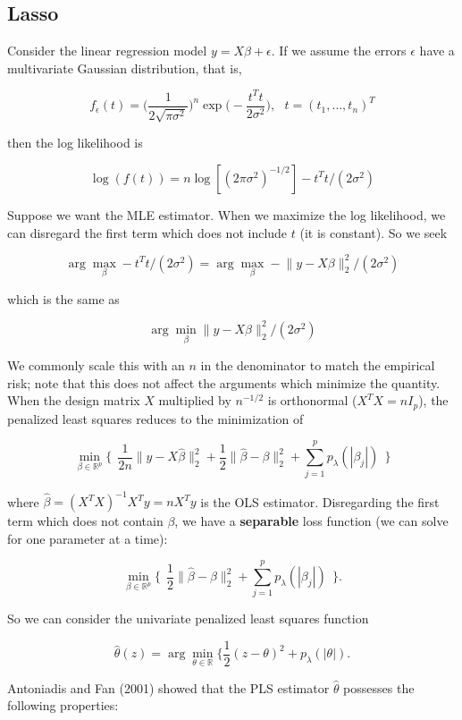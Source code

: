 \subsection{Lasso}

Consider the linear regression model \(y = X \beta + \epsilon\). If we assume the errors \(\epsilon\) have a multivariate Gaussian distribution, that is,

\[
f_\epsilon(t) = \bigg( \frac{1}{2 \sqrt{\pi \sigma^2}}   \bigg)^n \exp \bigg( - \frac{t^T t}{2 \sigma^2} \bigg) , \ \ \ t = (t_1, \ldots, t_n)^T
\]

then the log likelihood is

\[
\log(f(t)) = n \log[(2 \pi \sigma^2)^{-1/2}] - t^Tt/(2 \sigma^2)
\]

Suppose we want the MLE estimator. When we maximize the log likelihood, we can disregard the first term which does not include \(t\) (it is constant). So we seek

\[
\arg \max_{\beta} -t^Tt/(2 \sigma^2) = \arg \max_{\beta} - \lVert y - X \beta \rVert_2^2 /(2 \sigma^2)
\]

which is the same as

\[
 \arg \min_{\beta} \lVert y - X \beta \rVert_2^2 /(2 \sigma^2)
\]

We commonly scale this with an \(n\) in the denominator to match the empirical risk; note that this does not affect the arguments which minimize the quantity. When the design matrix \(X\) multiplied by \(n^{-1/2}\) is orthonormal (\(X^TX = nI_p\)), the penalized least squares reduces to the minimization of 

\[
\min_{\beta \in \mathbb{R}^p} \{ \ \ \frac{1}{2n} \lVert y - X \hat{\beta} \rVert_2^2 + \frac{1}{2} \lVert \hat{\beta} - \beta \rVert_2^2 + \sum_{j=1}^p p_\lambda ( | \beta_j|)   \ \ \}
\]

where \(\hat{\beta} = (X^TX)^{-1}X^Ty = nX^T y\) is the OLS estimator. Disregarding the first term which does not contain \(\beta\), we have a \textbf{separable} loss function (we can solve for one parameter at a time):

\[
\min_{\beta \in \mathbb{R}^p} \{ \ \ \frac{1}{2} \lVert \hat{\beta} - \beta \rVert_2^2 + \sum_{j=1}^p p_\lambda ( | \beta_j|)   \ \ \}.
\]

So we can consider the univariate penalized least squares function

\[
\hat{\theta}(z) = \arg \min_{\theta \in \mathbb{R}} \{ \frac{1}{2}(z - \theta)^2 + p_\lambda(|\theta|).
\]

Antoniadis and Fan (2001) showed that the PLS estimator \(\hat{\theta}\) possesses the following properties:

